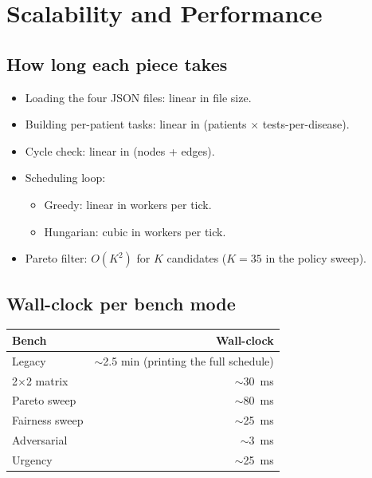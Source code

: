 \section{Scalability and Performance}
\label{sec:perf}

\subsection{How long each piece takes}

\begin{itemize}
  \item Loading the four JSON files: linear in file size.
  \item Building per-patient tasks: linear in (patients $\times$
        tests-per-disease).
  \item Cycle check: linear in (nodes + edges).
  \item Scheduling loop:
        \begin{itemize}
          \item Greedy: linear in workers per tick.
          \item Hungarian: cubic in workers per tick.
        \end{itemize}
  \item Pareto filter: $O(K^2)$ for $K$ candidates ($K\!=\!35$ in
        the policy sweep).
\end{itemize}

\subsection{Wall-clock per bench mode}

\begin{table}[H]
\centering
\small
\begin{tabular}{l r}
\toprule
\textbf{Bench} & \textbf{Wall-clock} \\
\midrule
Legacy             & $\sim$2.5 min (printing the full schedule) \\
2$\times$2 matrix  & $\sim$30~ms \\
Pareto sweep       & $\sim$80~ms \\
Fairness sweep     & $\sim$25~ms \\
Adversarial        & $\sim$3~ms \\
Urgency            & $\sim$25~ms \\
\bottomrule
\end{tabular}
\end{table}

